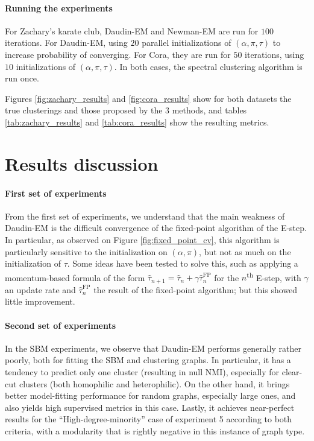 \documentclass[switch, 12pt]{article}
\begin{document}
\begin{multicols}{2}
    \paragraph{Running the experiments} For Zachary's karate club, Daudin-EM and Newman-EM are run for $100$ iterations. For Daudin-EM, using $20$ parallel initializations of $(\alpha, \pi, \tau)$ to increase probability of converging.
    For Cora, they are run for $50$ iterations, using $10$ initializations of $(\alpha, \pi, \tau)$.
    In both cases, the spectral clustering algorithm is run once.

    Figures \ref{fig:zachary_results} and \ref{fig:cora_results} show for both datasets the true clusterings and those proposed by the 3 methods, and tables \ref{tab:zachary_results} and \ref{tab:cora_results} show the resulting metrics.






    \section{Results discussion}
    \label{sec:discussion}

    \paragraph{First set of experiments}
    From the first set of experiments, we understand that the main weakness of Daudin-EM is the difficult convergence of the fixed-point algorithm of the E-step. In particular, as observed on Figure \ref{fig:fixed_point_cv}, this algorithm is particularly sensitive to the initialization on $(\alpha, \pi)$, but not as much on the initialization of $\tau$. Some ideas have been tested to solve this, such as applying a momentum-based formula of the form $\hat{\tau}_{n+1} = \hat{\tau}_{n} + \gamma \hat{\tau}_{n}^{\mathrm{FP}}$ for the $n$\textsuperscript{th} E-step, with $\gamma$ an update rate and $\hat{\tau}_{n}^{\mathrm{FP}}$ the result of the fixed-point algorithm; but this showed little improvement.

    \paragraph{Second set of experiments}
    In the SBM experiments, we observe that Daudin-EM performs generally rather poorly, both for fitting the SBM and clustering graphs. In particular, it has a tendency to predict only one cluster (resulting in null NMI), especially for clear-cut clusters (both homophilic and heterophilic). On the other hand, it brings better model-fitting performance for random graphs, especially large ones, and also yields high supervised metrics in this case. Lastly, it achieves near-perfect results for the ``High-degree-minority'' case of experiment 5 according to both criteria, with a modularity that is rightly negative in this instance of graph type.


\end{multicols}
\end{document}
